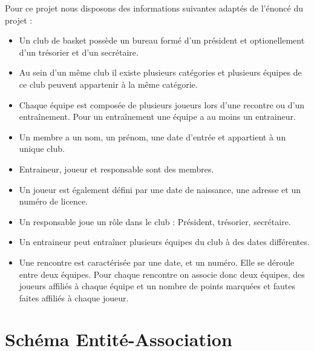 \documentclass[a4paper,8pt,french,fleqn]{report}
\begin{document}
Pour ce projet nous disposons des informations suivantes adaptés de l'énoncé du projet : \\

\begin{itemize}

\item Un club de basket possède un bureau formé d'un président et optionellement d'un trésorier et d'un secrétaire. \\

\item Au sein d'un même club il existe plusieurs catégories et plusieurs équipes de ce club peuvent appartenir à la même catégorie. \\

\item Chaque équipe est composée de plusieurs joueurs lors d'une recontre ou d'un entraînement. Pour un entraînement une équipe a au moins un entraineur. \\

\item Un membre a un nom, un prénom, une date d'entrée et appartient à un unique club. \\

\item Entraineur, joueur et responsable sont des membres. \\

\item Un joueur est également défini par une date de naissance, une adresse et un numéro de licence. \\

\item Un responsable joue un rôle dans le club : Président, trésorier, secrétaire. \\

\item Un entraineur peut entraîner plusieurs équipes du club à des dates différentes. \\

\item Une rencontre est caractérisée par une date, et un numéro. Elle se déroule entre deux équipes. Pour chaque rencontre on associe donc deux équipes, des joueurs affiliés à chaque équipe et un nombre de points marquées et fautes faites affiliés à chaque joueur.

\end{itemize}

\section{Schéma Entité-Association}
\end{document}
